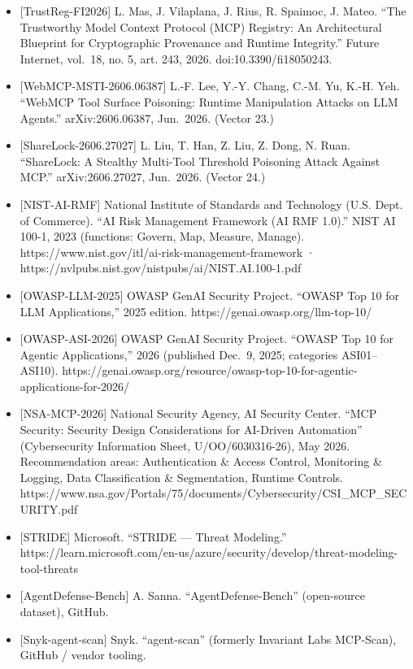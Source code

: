 \documentclass[
]{article}
\begin{document}
\begin{itemize}
  {[}ETDI-2506.01333{]} M. Bhatt, V. S. Narajala, I. Habler. ``ETDI:
  Mitigating Tool Squatting and Rug Pull Attacks in Model Context
  Protocol (MCP) by using OAuth-Enhanced Tool Definitions and
  Policy-Based Access Control.'' arXiv:2506.01333, Jun.~2025.
\item
  {[}TrustReg-FI2026{]} L. Mas, J. Vilaplana, J. Rius, R. Spaimoc, J.
  Mateo. ``The Trustworthy Model Context Protocol (MCP) Registry: An
  Architectural Blueprint for Cryptographic Provenance and Runtime
  Integrity.'' Future Internet, vol.~18, no. 5, art. 243, 2026.
  doi:10.3390/fi18050243.
\item
  {[}WebMCP-MSTI-2606.06387{]} L.-F. Lee, Y.-Y. Chang, C.-M. Yu, K.-H.
  Yeh. ``WebMCP Tool Surface Poisoning: Runtime Manipulation Attacks on
  LLM Agents.'' arXiv:2606.06387, Jun.~2026. (Vector 23.)
\item
  {[}ShareLock-2606.27027{]} L. Liu, T. Han, Z. Liu, Z. Dong, N. Ruan.
  ``ShareLock: A Stealthy Multi-Tool Threshold Poisoning Attack Against
  MCP.'' arXiv:2606.27027, Jun.~2026. (Vector 24.)
\item
  {[}NIST-AI-RMF{]} National Institute of Standards and Technology (U.S.
  Dept. of Commerce). ``AI Risk Management Framework (AI RMF 1.0).''
  NIST AI 100-1, 2023 (functions: Govern, Map, Measure, Manage).
  https://www.nist.gov/itl/ai-risk-management-framework ·
  https://nvlpubs.nist.gov/nistpubs/ai/NIST.AI.100-1.pdf
\item
  {[}OWASP-LLM-2025{]} OWASP GenAI Security Project. ``OWASP Top 10 for
  LLM Applications,'' 2025 edition. https://genai.owasp.org/llm-top-10/
\item
  {[}OWASP-ASI-2026{]} OWASP GenAI Security Project. ``OWASP Top 10 for
  Agentic Applications,'' 2026 (published Dec.~9, 2025; categories
  ASI01--ASI10).
  https://genai.owasp.org/resource/owasp-top-10-for-agentic-applications-for-2026/
\item
  {[}NSA-MCP-2026{]} National Security Agency, AI Security Center. ``MCP
  Security: Security Design Considerations for AI-Driven Automation''
  (Cybersecurity Information Sheet, U/OO/6030316-26), May 2026.
  Recommendation areas: Authentication \& Access Control, Monitoring \&
  Logging, Data Classification \& Segmentation, Runtime Controls.
  https://www.nsa.gov/Portals/75/documents/Cybersecurity/CSI\_MCP\_SECURITY.pdf
\item
  {[}STRIDE{]} Microsoft. ``STRIDE --- Threat Modeling.''
  https://learn.microsoft.com/en-us/azure/security/develop/threat-modeling-tool-threats
\item
  {[}AgentDefense-Bench{]} A. Sanna. ``AgentDefense-Bench'' (open-source
  dataset), GitHub.
\item
  {[}Snyk-agent-scan{]} Snyk. ``agent-scan'' (formerly Invariant Labs
  MCP-Scan), GitHub / vendor tooling.
\end{itemize}
\end{document}
